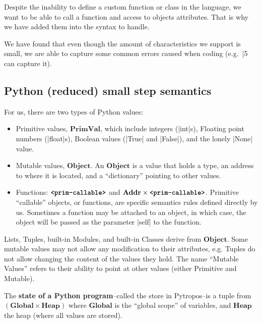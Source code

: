 Despite the inability to define a custom function or class in the language, we
want to be able to call a function and access to objects attributes. That is why we have
added them into the syntax to handle.

We have found that even though the amount of characteristics we support is small, we are
able to capture some common errors caused when coding (e.g.~\pycode|5 %
can capture it).

\subsection{Python (reduced) small step semantics}\label{reducedsyntaxapp}

For us, there are two types of Python values:

\begin{itemize}
\tightlist
\item Primitive values, \(\mathbf{PrimVal}\), which include integers (\pycode|int|s),
  Floating point numbers (\pycode|float|s), Boolean values (\pycode|True| and
  \pycode|False|), and the lonely \pycode|None| value.
\item Mutable values, \(\mathbf{Object}\). An \(\mathbf{Object}\) is a value that holds a
  type, an address to where it is located, and a \enquote{dictionary} pointing to other
  values.
\item Functions: \(\textbf{\texttt{<prim-callable>}}\) and
  \(\mathbf{Addr} \times \textbf{\texttt{<prim-callable>}}\). Primitive \enquote{callable}
  objects, or functions, are specific semantics rules defined directly by us. Sometimes a
  function may be attached to an object, in which case, the object will be passed as the
  parameter \pycode|self| to the function.
\end{itemize}

Lists, Tuples, built-in Modules, and built-in Classes derive from \(\mathbf{Object}\).
Some mutable values may not allow any modification to their attributes, e.g.  Tuples do
not allow changing the content of the values they hold. The name \enquote{Mutable Values}
refers to their ability to point at other values (either Primitive and Mutable).

The \textbf{state of a Python program}--called the store in Pytropos--is a tuple
from \(\left(\mathbf{Global} \times \mathbf{Heap}\right)\) where \(\mathbf{Global}\) is
the \enquote{global scope} of variables, and \(\mathbf{Heap}\) the heap (where all values
are stored).

